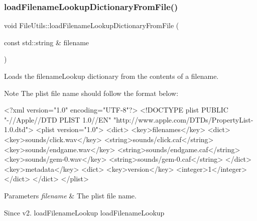 \subsubsection{\texorpdfstring{load\+Filename\+Lookup\+Dictionary\+From\+File()}{loadFilenameLookupDictionaryFromFile()}\hspace{0.1cm}{\footnotesize\ttfamily [1/2]}}
{\footnotesize\ttfamily void File\+Utils\+::load\+Filename\+Lookup\+Dictionary\+From\+File (\begin{DoxyParamCaption}\item[{const std\+::string \&}]{filename }\end{DoxyParamCaption})\hspace{0.3cm}{\ttfamily [virtual]}}

Loads the filename\+Lookup dictionary from the contents of a filename.

\begin{DoxyNote}{Note}
The plist file name should follow the format below\+:
\end{DoxyNote}

\begin{DoxyCode}
<?xml version=\textcolor{stringliteral}{"1.0"} encoding=\textcolor{stringliteral}{"UTF-8"}?>
<!DOCTYPE plist PUBLIC \textcolor{stringliteral}{"-//Apple//DTD PLIST 1.0//EN"} \textcolor{stringliteral}{"http://www.apple.com/DTDs/PropertyList-1.0.dtd"}>
<plist version=\textcolor{stringliteral}{"1.0"}>
<dict>
    <key>filenames</key>
    <dict>
        <key>sounds/click.wav</key>
        <\textcolor{keywordtype}{string}>sounds/click.caf</\textcolor{keywordtype}{string}>
        <key>sounds/endgame.wav</key>
        <\textcolor{keywordtype}{string}>sounds/endgame.caf</\textcolor{keywordtype}{string}>
        <key>sounds/gem-0.wav</key>
        <\textcolor{keywordtype}{string}>sounds/gem-0.caf</\textcolor{keywordtype}{string}>
    </dict>
    <key>metadata</key>
    <dict>
        <key>version</key>
        <integer>1</integer>
    </dict>
</dict>
</plist>
\end{DoxyCode}
 
\begin{DoxyParams}{Parameters}
{\em filename} & The plist file name.\\
\hline
\end{DoxyParams}
\begin{DoxySince}{Since}
v2.  load\+Filename\+Lookup  load\+Filename\+Lookup 
\end{DoxySince}
\mbox{\label{classFileUtils_ae8308c3d358c44312b6d804287dad1b7}} 
